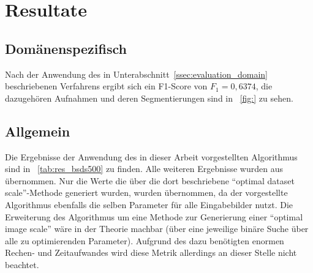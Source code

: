 

\section{Resultate}
\label{sec:results}

\subsection{Domänenspezifisch}
\label{ssec:results_domain}

Nach der Anwendung des in Unterabschnitt~\ref{ssec:evaluation_domain} beschriebenen Verfahrens ergibt sich ein F1-Score von $F_1=0,6374$, die dazugehören Aufnahmen und deren Segmentierungen sind in \figurename~\ref{fig:} zu sehen.




\subsection{Allgemein}
\label{ssec:results_general}
Die Ergebnisse der Anwendung des in dieser Arbeit vorgestellten Algorithmus sind in \tablename~\ref{tab:res_bsds500} zu finden. Alle weiteren Ergebnisse wurden aus \cite{arbelaez_10} übernommen. Nur die Werte die über die dort beschriebene \enquote{optimal dataset scale}-Methode generiert wurden, wurden übernommen, da der vorgestellte Algorithmus ebenfalls die selben Parameter für alle Eingabebilder nutzt. Die Erweiterung des Algorithmus um eine Methode zur Generierung einer \enquote{optimal image scale} wäre in der Theorie machbar (\bspw über eine jeweilige binäre Suche über alle zu optimierenden Parameter). Aufgrund des dazu benötigten enormen Rechen- und Zeitaufwandes wird diese Metrik allerdings an dieser Stelle nicht beachtet.


